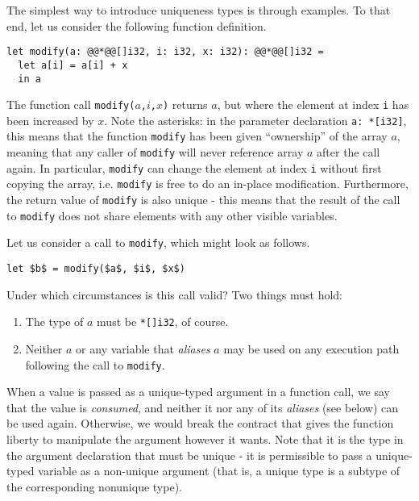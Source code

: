 \documentclass[oneside,11pt]{book}
\begin{document}
The simplest way to introduce uniqueness types is through examples.
To that end, let us consider the following function definition.

\begin{lstlisting}
let modify(a: @@*@@[]i32, i: i32, x: i32): @@*@@[]i32 =
  let a[i] = a[i] + x
  in a
\end{lstlisting}

The function call \texttt{modify($a$,$i$,$x$)} returns $a$, but where
the element at index \texttt{i} has been increased by $x$.  Note the
asterisks: in the parameter declaration \texttt{a: *[i32]}, this means
that the function \texttt{modify} has been given ``ownership'' of the
array $a$, meaning that any caller of \texttt{modify} will never
reference array $a$ after the call again.  In particular,
\texttt{modify} can change the element at index \texttt{i} without
first copying the array, i.e. \texttt{modify} is free to do an
in-place modification.  Furthermore, the return value of
\texttt{modify} is also unique - this means that the result of the
call to \texttt{modify} does not share elements with any other visible
variables.

Let us consider a call to \texttt{modify}, which might look as
follows.

\begin{lstlisting}[mathescape=true]
let $b$ = modify($a$, $i$, $x$)
\end{lstlisting}

Under which circumstances is this call valid?  Two things must hold:
\begin{enumerate}
\item The type of \texttt{$a$} must be \texttt{*[]i32}, of course.

\item Neither \texttt{$a$} or any variable that \textit{aliases}
  \texttt{$a$} may be used on any execution path following the call to
  \texttt{modify}.
\end{enumerate}

When a value is passed as a unique-typed argument in a function call,
we say that the value is \textit{consumed}, and neither it nor any of
its \textit{aliases} (see below) can be used again.  Otherwise, we
would break the contract that gives the function liberty to manipulate
the argument however it wants.  Note that it is the type in the
argument declaration that must be unique - it is permissible to pass a
unique-typed variable as a non-unique argument (that is, a unique type
is a subtype of the corresponding nonunique type).
\end{document}
